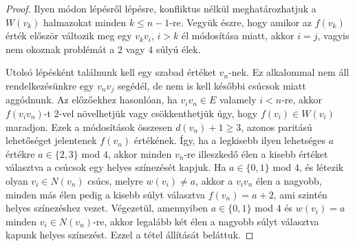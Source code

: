 \documentclass[12pt, a4paper]{report}
\theoremstyle{remark}
\theoremstyle{definition}
\begin{document}
\begin{proof}
Ilyen módon lépésről lépésre, konfliktus nélkül meghatározhatjuk a $W(v_k)$ halmazokat minden $k \leq n - 1$-re. Vegyük észre, hogy amikor az $f(v_k)$ érték először változik meg egy $v_k v_i$, $i > k$ él módosítása miatt, akkor $i = j$, vagyis nem okoznak problémát a $2$ vagy $4$ súlyú élek.

Utolsó lépésként találnunk kell egy szabad értéket $v_n$-nek. Ez alkalommal nem áll rendelkezésünkre egy $v_n v_j$ segédél, de nem is kell későbbi csúcsok miatt aggódnunk. Az előzőekhez hasonlóan, ha $v_i v_n \in E$ valamely $i < n$-re, akkor $f(v_i v_n)$-t $2$-vel növelhetjük vagy csökkenthetjük úgy, hogy $f(v_i) \in W(v_i)$ maradjon. Ezek a módosítások összesen $d(v_n) +1 \geq 3$, azonos paritású lehetőséget jelentenek $f(v_n)$ értékének. Így, ha a legkisebb ilyen lehetséges $a$ értékre $a \in \lbrace 2, 3 \rbrace$ mod $4$, akkor minden $v_n$-re illeszkedő élen a kisebb értéket választva a csúcsok egy helyes színezését kapjuk. Ha $a \in \lbrace 0, 1 \rbrace$ mod $4$, és létezik olyan $v_i \in N(v_n)$ csúcs, melyre $w(v_i) \neq a$, akkor a $v_i v_n$ élen a nagyobb, minden más élen pedig a kisebb súlyt választva $f(v_n) = a + 2$, ami szintén helyes színezéshez vezet. Végezetül, amennyiben $a \in \lbrace 0, 1 \rbrace$ mod $4$ és $w(v_i) = a$ minden $v_i \in N(v_n)$-re, akkor legalább két élen a nagyobb súlyt választva kapunk helyes színezést. Ezzel a tétel állítását beláttuk.
\end{proof}

\nocite{*}
\printbibliography
\end{document}
